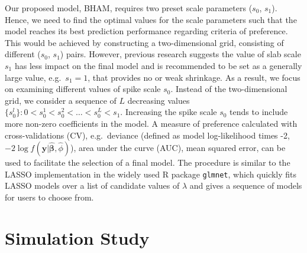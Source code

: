 \documentclass[AMA,STIX1COL,]{WileyNJD-v2}
\begin{document}
Our proposed model, BHAM, requires two preset scale parameters (\(s_0\),
\(s_1\)). Hence, we need to find the optimal values for the scale
parameters such that the model reaches its best prediction performance
regarding criteria of preference. This would be achieved by constructing
a two-dimensional grid, consisting of different (\(s_0\), \(s_1\))
pairs. However, previous research suggests the value of slab scale
\(s_1\) has less impact on the final model and is recommended to be set
as a generally large value, e.g.~\(s_1 = 1\), that provides no or weak
shrinkage. \citep{Rockova2018} As a result, we focus on examining
different values of spike scale \(s_0\). Instead of the two-dimensional
grid, we consider a sequence of \(L\) decreasing values
\(\{s_0^l\}: 0 < s_0^1 < s_0^2 < \dots < s_0^L < s_1\). Increasing the
spike scale \(s_0\) tends to include more non-zero coefficients in the
model. A measure of preference calculated with cross-validations (CV),
e.g.~deviance (defined as model log-likelihood times -2,
\(-2\log f(\boldsymbol{y}|\boldsymbol{\hat\beta}, \hat\phi)\)), area
under the curve (AUC), mean squared error, can be used to facilitate the
selection of a final model. The procedure is similar to the LASSO
implementation in the widely used R package \texttt{glmnet}, which
quickly fits LASSO models over a list of candidate values of \(\lambda\)
and gives a sequence of models for users to choose from.

\section{Simulation Study}
\label{sec:sim}
\end{document}
